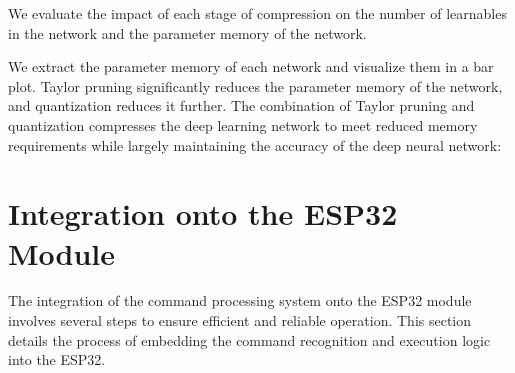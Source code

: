 \documentclass[a4paper]{report}
\begin{document}
{\begin{center}
\end{center}

We evaluate the impact of each stage of compression on the number of learnables in the network and the parameter memory of the network.


We extract the parameter memory of each network and visualize them in a bar plot. Taylor pruning significantly reduces the parameter memory of the network, and quantization reduces it further. The combination of Taylor pruning and quantization compresses the deep learning network to meet reduced memory requirements while largely maintaining the accuracy of the deep neural network:

\begin{center}
\end{center}
\begin{center}

\end{center}
\newpage
\section{Integration onto the ESP32 Module}
The integration of the command processing system onto the ESP32 module involves several steps to ensure efficient and reliable operation. This section details the process of embedding the command recognition and execution logic into the ESP32.

}
\end{document}
